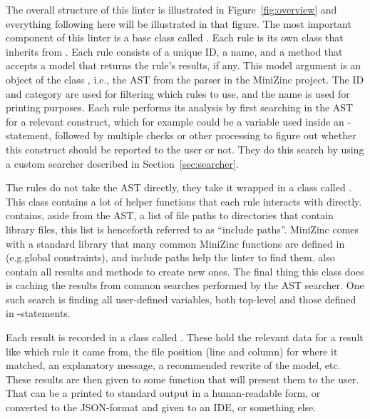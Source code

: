 \documentclass[a4paper,12pt]{article}
\begin{document}
The overall structure of this linter is illustrated in Figure~\ref{fig:overview} and
everything following here will be illustrated in that figure. The most important component
of this linter is a base class called . Each rule
is its own class that inherits from . Each rule
consists of a unique ID, %
a name, and a method that accepts a model that returns the rule's results, if any.
This model argument is an object of the class , i.e., the AST from the parser
in the MiniZinc project.
The ID and category are used for filtering which rules to use, and the name is used
for printing purposes. Each rule performs its analysis by first searching in the AST for a
relevant construct, which for example could be a variable used inside an
-statement, followed by multiple checks or other processing to figure out whether
this construct should be reported to the user or not. They do this search by using a
custom searcher described in Section~\ref{sec:searcher}.

\begin{sloppypar}
The rules do not take the AST directly, they take it wrapped in a class called
. This class contains a lot of helper functions that each rule interacts with
directly.  contains, aside from the AST, a list of file paths
to directories that contain library files, this list is henceforth referred to as
``include paths''.
MiniZinc comes with a standard library that many
common MiniZinc functions are defined in (e.g.\@ global constraints), and include paths help the linter to find them.
 also contain all results and methods to create new ones. The final thing
this class does is caching the results from common searches performed by the AST searcher.
One such search is finding all user-defined
variables, both top-level and those defined in -statements.
\end{sloppypar}

Each result is recorded in a class called . These hold the relevant data
for a result like which rule it came from, the file position (line and column) for where it
matched, an explanatory message, a recommended rewrite of the model, etc. These results are
then given to some function that will present them to the user. That can be a
printed to standard output in a human-readable form, or converted to the JSON-format and
given to an IDE, or something else.
\end{document}
